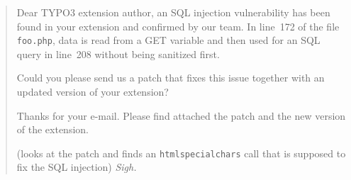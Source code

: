 \begin{quote}

 Dear TYPO3 extension author, an SQL injection vulnerability has been found in your extension and confirmed by our team. In line~172 of the file \texttt{foo.php}, data is read from a GET variable and then used for an SQL query in line~208 without being sanitized first.

Could you please send us a patch that fixes this issue together with an updated version of your extension?

 Thanks for your e-mail. Please find attached the patch and the new version of the extension.

 (looks at the patch and finds an \texttt{htmlspecialchars} call that is supposed to fix the SQL injection) \emph{Sigh.}

\end{quote}
